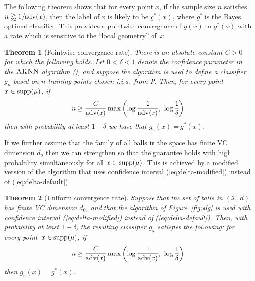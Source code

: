 \documentclass{article}
\def\X{{\mathcal X}}
\def\supp{{\rm supp}}
\def\adv{{\rm adv}}
\newcommand{\algname}{\textsc{AKNN}}
\newtheorem{theorem}{Theorem}
\newcommand{\comment}[3]{{\color{#1} {\bf #2 :} #3}}
\newcommand{\shay}[1]{\comment{purple}{Shay}{#1}}
\begin{document}
The following theorem shows that for every point $x$,
if the sample size $n$ satisfies $n\gtrapprox 1/\adv(x)$,
then the label of $x$ is likely to be $g^*(x)$, where $g^*$ is the Bayes optimal classifier.
This provides a pointwise convergence of $g(x)$ to $g^*(x)$ with a rate which
is sensitive to the ``local geometry'' of~$x$.

\begin{theorem}[Pointwise convergence rate]
There is an absolute constant $C > 0$ for which the following holds.
Let $0 < \delta < 1$ denote the confidence parameter in the $\algname$ algorithm (),
and suppose the algorithm is used to define a classifier $g_n$ based on $n$ training points chosen i.i.d.\ from $P$. 
Then, for every point $x\in\supp(\mu)$, if
\[n \geq \frac{C}{\adv(x)} \max \left( \log \frac{1}{\adv(x)}, \ \log \frac{1}{\delta} \right)\]
then with probability at least $1-\delta$ we have that $g_n(x)=g^*(x)$.
\label{thm:pointwise-rate}
\end{theorem}

If we further assume that the family of all balls in the space has finite VC dimension $d_o$ then 
we can strengthen  so that the guarantee holds with high probability \underline{simultaneously} for all $x\in \supp(\mu)$.
This is achieved by a modified version of the algorithm that uses confidence interval (\ref{eq:delta-modified}) instead of (\ref{eq:delta-default}).



\begin{theorem} [Uniform convergence rate]
Suppose that the set of balls in $(\X,d)$ has finite VC dimension $d_0$, and that the algorithm of Figure~\ref{fig:alg} is used with confidence interval (\ref{eq:delta-modified}) instead of (\ref{eq:delta-default}). 
Then, with probability at least $1-\delta$, the resulting classifier $g_n$ satisfies the following: 
for every point~$x\in\supp(\mu)$, if
\[n \geq \frac{C}{\adv(x)} \max \left( \log \frac{1}{\adv(x)}, \ \log \frac{1}{\delta} \right)\]
then $g_n(x)=g^*(x)$.
\label{thm:uniform-rate}
\end{theorem}
\end{document}
